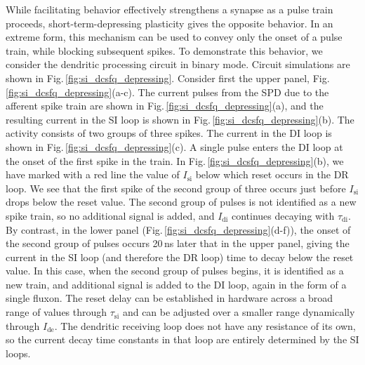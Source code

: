\documentclass[twocolumn]{article}
\begin{document}
While facilitating behavior effectively strengthens a synapse as a pulse train proceeds, short-term-depressing plasticity gives the opposite behavior. In an extreme form, this mechanism can be used to convey only the onset of a pulse train, while blocking subsequent spikes. To demonstrate this behavior, we consider the dendritic processing circuit in binary mode. Circuit simulations are shown in Fig.\,\ref{fig:si_dcsfq_depressing}. Consider first the upper panel, Fig.\,\ref{fig:si_dcsfq_depressing}(a-c). The current pulses from the SPD due to the afferent spike train are shown in Fig.\,\ref{fig:si_dcsfq_depressing}(a), and the resulting current in the SI loop is shown in Fig.\,\ref{fig:si_dcsfq_depressing}(b). The activity consists of two groups of three spikes. The current in the DI loop is shown in Fig.\,\ref{fig:si_dcsfq_depressing}(c). A single pulse enters the DI loop at the onset of the first spike in the train. In Fig.\,\ref{fig:si_dcsfq_depressing}(b), we have marked with a red line the value of $I_{\mathrm{si}}$ below which reset occurs in the DR loop. We see that the first spike of the second group of three occurs just before $I_{\mathrm{si}}$ drops below the reset value. The second group of pulses is not identified as a new spike train, so no additional signal is added, and $I_{\mathrm{di}}$ continues decaying with $\tau_{\mathrm{di}}$. By contrast, in the lower panel (Fig.\,\ref{fig:si_dcsfq_depressing}(d-f)), the onset of the second group of pulses occurs 20\,ns later that in the upper panel, giving the current in the SI loop (and therefore the DR loop) time to decay below the reset value. In this case, when the second group of pulses begins, it is identified as a new train, and additional signal is added to the DI loop, again in the form of a single fluxon. The reset delay can be established in hardware across a broad range of values through $\tau_{\mathrm{si}}$ and can be adjusted over a smaller range dynamically through $I_{\mathrm{de}}$. The dendritic receiving loop does not have any resistance of its own, so the current decay time constants in that loop are entirely determined by the SI loops. 
\end{document}
